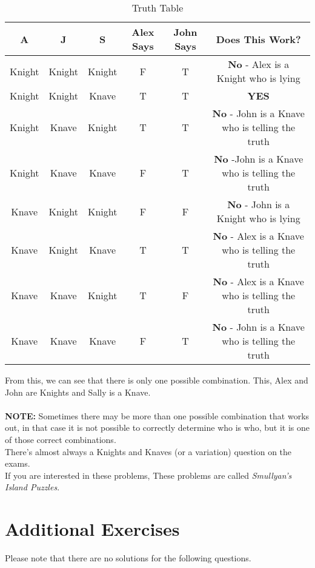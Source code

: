 \begin{table}[ht]
\caption{Truth Table} %
\centering %
\begin{tabular}{c c c c c c} %
\hline\hline %
A & J & S & Alex Says & John Says & Does This Work?\\ [0.5ex]
\hline %
Knight & Knight & Knight & F & T & \textbf{No} - Alex is a Knight who is
lying\\
Knight & Knight & Knave & T & T & \textbf{YES}\\
Knight & Knave & Knight & T & T & \textbf{No} - John is a Knave who is telling
the truth\\
Knight & Knave & Knave & F & T & \textbf{No} -John is a Knave who is telling
the truth\\
Knave & Knight & Knight & F & F & \textbf{No} - John is a Knight who is lying\\
Knave & Knight & Knave & T & T & \textbf{No} - Alex is a Knave who is telling
the truth\\
Knave & Knave & Knight & T & F & \textbf{No} - Alex is a Knave who is telling
the truth \\
Knave & Knave & Knave & F & T & \textbf{No} - John is a Knave who is telling
the truth\\[1ex] %
\hline %
\end{tabular}
\label{table:nonlin} %
\end{table}
\noindent From this, we can see that there is only one possible combination.
This, Alex and John are Knights and Sally is a Knave. \\ \\
\textbf{NOTE:} Sometimes there may be more than one possible combination that
works out, in that case it is not possible to correctly determine who is who,
but it is one of those correct combinations. \\
\indent There's almost always a Knights and Knaves (or a variation) question on
the exams.\\
\indent If you are interested in these problems, These problems are called
\emph{Smullyan's Island Puzzles}.
\noindent
\section{Additional Exercises}
Please note that there are no solutions for the following questions.
